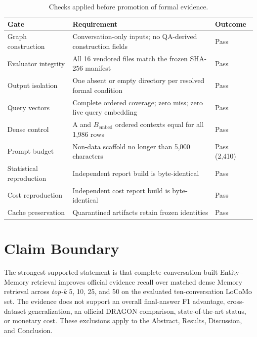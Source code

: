 \documentclass[10pt,twocolumn]{article}
\newcommand{\bembed}{B_{\mathrm{embed}}}
\newcommand{\topk}{\textit{top-k}}
\begin{document}
\begin{table}[h]
\centering
\caption{Checks applied before promotion of formal evidence.}
\label{tab:gates}
\begin{tabularx}{\textwidth}{@{}lXl@{}}
\toprule
Gate & Requirement & Outcome \\
\midrule
Graph construction & Conversation-only inputs; no QA-derived construction fields & Pass \\
Evaluator integrity & All 16 vendored files match the frozen SHA-256 manifest & Pass \\
Output isolation & One absent or empty directory per resolved formal condition & Pass \\
Query vectors & Complete ordered coverage; zero miss; zero live query embedding & Pass \\
Dense control & A and \(\bembed\) ordered contexts equal for all 1,986 rows & Pass \\
Prompt budget & Non-data scaffold no longer than 5,000 characters & Pass (2,410) \\
Statistical reproduction & Independent report build is byte-identical & Pass \\
Cost reproduction & Independent cost report build is byte-identical & Pass \\
Cache preservation & Quarantined artifacts retain frozen identities & Pass \\
\bottomrule
\end{tabularx}
\end{table}

\section{Claim Boundary}

The strongest supported statement is that complete conversation-built
Entity--Memory retrieval improves official evidence recall over matched dense
Memory retrieval across \topk{} 5, 10, 25, and 50 on the evaluated
ten-conversation LoCoMo set. The evidence does not support an overall
final-answer F1 advantage, cross-dataset generalization, an official DRAGON
comparison, state-of-the-art status, or monetary cost. These exclusions apply
to the Abstract, Results, Discussion, and Conclusion.
\end{document}
